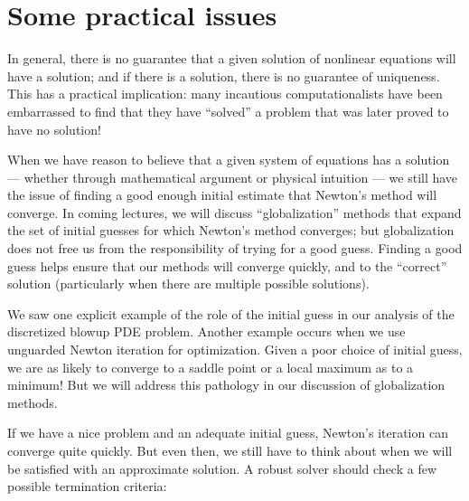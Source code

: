 \documentclass[12pt, leqno]{article} %
\begin{document}
\section{Some practical issues}

In general, there is no guarantee that a given solution of nonlinear
equations will have a solution; and if there is a solution, there is no
guarantee of uniqueness. This has a practical implication: many
incautious computationalists have been embarrassed to find that they
have ``solved'' a problem that was later proved to have no solution!

When we have reason to believe that a given system of equations has a
solution --- whether through mathematical argument or physical intuition
--- we still have the issue of finding a good enough initial estimate
that Newton's method will converge. In coming lectures, we will discuss
``globalization'' methods that expand the set of initial guesses for
which Newton's method converges; but globalization does not free us from
the responsibility of trying for a good guess. Finding a good guess
helps ensure that our methods will converge quickly, and to the
``correct'' solution (particularly when there are multiple possible
solutions).

We saw one explicit example of the role of the initial guess in our
analysis of the discretized blowup PDE problem. Another example occurs
when we use unguarded Newton iteration for optimization. Given a poor
choice of initial guess, we are as likely to converge to a saddle point
or a local maximum as to a minimum! But we will address this pathology
in our discussion of globalization methods.

If we have a nice problem and an adequate initial guess, Newton's
iteration can converge quite quickly. But even then, we still have to
think about when we will be satisfied with an approximate solution. A
robust solver should check a few possible termination criteria:
\end{document}
